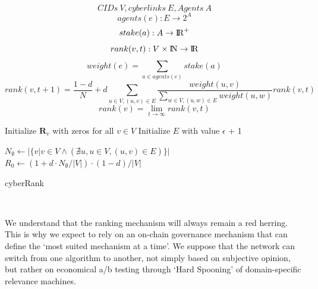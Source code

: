 \documentclass[8pt,oneside]{amsart}
\begin{document}
$$ CIDs \ V, cyberlinks \ E, Agents \ A $$
$$agents(e): E \rightarrow 2^{A}$$
$$stake(a): A \rightarrow {\rm I\!R}^+ $$
$$rank(v, t): V \times {\rm I\!N} \rightarrow {\rm I\!R} $$
$$weight(e) = \sum\limits_{a \in agents(e)}{stake(a)}$$
$$rank(v, t + 1) = \frac{1 - d}{N} + d\sum\limits_{u \in V, (u, v) \in E}{\frac{weight(u, v)}{\sum_{w \in V, (u, w) \in E}{weight(u, w)}}rank(v, t)} $$
$$rank(v) = \lim\limits_{t \rightarrow \infty} rank(v, t)$$
\begin{algorithm}


\BlankLine
Initialize $\textbf{R}_{v}$ with zeros for all $v \in V$\;
Initialize $E$ with value $\epsilon$ + 1\;

\BlankLine
$N_{\emptyset} \leftarrow |\{v|v \in V \land (\nexists u, u \in V, (u, v) \in E )\}|$ \;
$R_{0} \leftarrow (1 + d \cdot N_{\emptyset} / |V|) \cdot (1 - d) / |V| $ \;

\BlankLine
{}

\caption{cyberRank}\label{algo_disjdecomp}
\end{algorithm}\

We understand that the ranking mechanism will always remain a red herring. This is why we expect to rely on an on-chain governance mechanism that can define the ‘most suited mechanism at a time’. We suppose that the network can switch from one algorithm to another, not simply based on subjective opinion, but rather on economical a/b testing through ‘Hard Spooning’ of domain-specific relevance machines.
\end{document}
